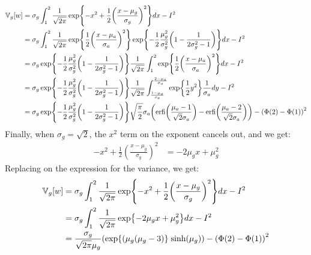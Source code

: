 \begin{align*}
\VAR_g[w] &= \sigma_g \int_{1}^{2} \frac{1}{\sqrt{2 \pi}} \exp \left\{ -x^{2} +\frac{1}{2} \left(\frac{x - \mu_g}{\sigma_g}\right)^{2} \right\} dx - I^{2} \\
&= \sigma_g \int_{1}^{2} \frac{1}{\sqrt{2 \pi}} \exp \left\{ \frac{1}{2} \left( \frac{x - \mu_a}{\sigma_a} \right)^{2} \right\} \exp \left\{ - \frac{1}{2} \frac{\mu_g^{2}}{\sigma_g^{2}} \left(1 - \frac{1}{2\sigma_g^{2} - 1} \right) \right\} dx - I^{2} \\
&= \sigma_g \exp \left\{ - \frac{1}{2} \frac{\mu_g^{2}}{\sigma_g^{2}} \left(1 - \frac{1}{2\sigma_g^{2} - 1} \right) \right\} \frac{1}{\sqrt{2 \pi}} \int_{1}^{2} \exp \left\{ \frac{1}{2} \left( \frac{x - \mu_a}{\sigma_a} \right)^{2} \right\} dx - I^{2} \\
&= \sigma_g \exp \left\{ - \frac{1}{2} \frac{\mu_g^{2}}{\sigma_g^{2}} \left(1 - \frac{1}{2\sigma_g^{2} - 1} \right) \right\} \frac{1}{\sqrt{2 \pi}} \int_{\frac{1 - \mu_a}{\sigma_a}}^{\frac{2 - \mu_a}{\sigma_a}} \exp \left\{ \frac{1}{2} y^{2} \right\} \frac{1}{\sigma_a} dy - I^{2} \\
&= \sigma_g \exp \left\{ - \frac{1}{2} \frac{\mu_g^{2}}{\sigma_g^{2}} \left(1 - \frac{1}{2\sigma_g^{2} - 1} \right) \right\} \sqrt{\frac{\pi}{2}} \sigma_a \left( \text{erfi}\left( \frac{\mu_a - 1}{\sqrt{2} \sigma_a} \right) - \text{erfi}\left( \frac{\mu_a - 2}{\sqrt{2} \sigma_a} \right) \right) - \left( \Phi(2) - \Phi(1) \right)^{2}
\end{align*}
Finally, when \(\sigma_g = \sqrt{2}\), the \(x^{2}\) term on the exponent
cancels out, and we get:
\begin{align*}
-x^{2} + \frac{1}{2} \left(\frac{x - \mu_g}{\sigma_g}\right)^{2} &= -2 \mu_g x + \mu_g^{2}
\end{align*}
Replacing on the expression for the variance, we get:
\begin{align*}
\VAR_g[w] &= \sigma_g \int_{1}^{2} \frac{1}{\sqrt{2 \pi}} \exp \left\{ -x^{2} +\frac{1}{2} \left(\frac{x - \mu_g}{\sigma_g}\right)^{2} \right\} dx - I^{2} \\
&= \sigma_g \int_{1}^{2} \frac{1}{\sqrt{2 \pi}} \exp \left\{ -2 \mu_g x + \mu_g^{2} \right\} dx - I^{2} \\
&= \frac{\sigma_g }{\sqrt{2 \pi} \mu_g} \left( \exp \left\{ (\mu_g (\mu_g - 3) \right\} \; \text{sinh} (\mu_g) \right) - \left( \Phi(2) - \Phi(1) \right)^{2}
\end{align*}

